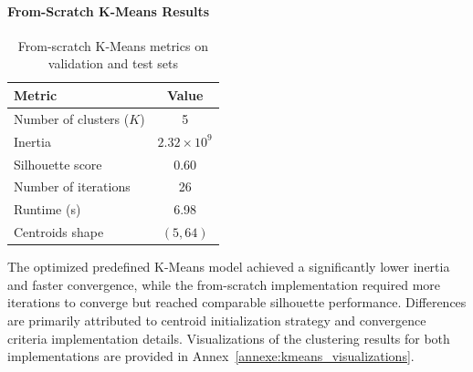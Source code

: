 \paragraph{From-Scratch K-Means Results}
\begin{table}[H]
\centering
\caption{From-scratch K-Means metrics on validation and test sets}
\begin{tabular}{lc}
\hline
\textbf{Metric} & \textbf{Value} \\
\hline
Number of clusters ($K$) & 5 \\
Inertia & $2.32 \times 10^{9}$ \\
Silhouette score & 0.60 \\
Number of iterations & 26 \\
Runtime (s) & 6.98 \\
Centroids shape & $(5,64)$ \\
\hline
\end{tabular}
\end{table}

The optimized predefined K-Means model achieved a significantly lower inertia and faster convergence, while the from-scratch implementation required more iterations to converge but reached comparable silhouette performance. Differences are primarily attributed to centroid initialization strategy and convergence criteria implementation details.
Visualizations of the clustering results for both implementations are provided in Annex~\ref{annexe:kmeans_visualizations}.